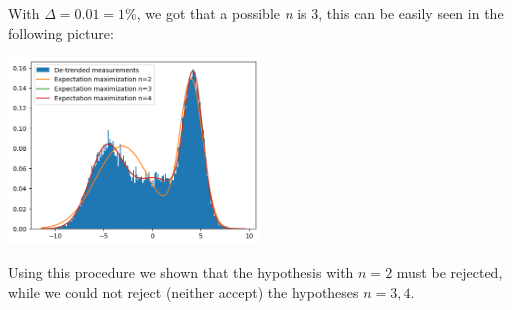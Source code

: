 \documentclass[10pt,a4paper]{article}
\begin{document}
With \(\Delta = 0.01 = 1\%\), we got that a possible \emph{n} is 3, this can be easily seen in the following picture:

\begin{center}
  \includegraphics[width=0.5\textwidth]{point5.png}
\end{center}

Using this procedure we shown that the hypothesis with \(n = 2\) must be rejected, while we could not reject (neither accept) the hypotheses \(n = 3, 4\).
\end{document}
